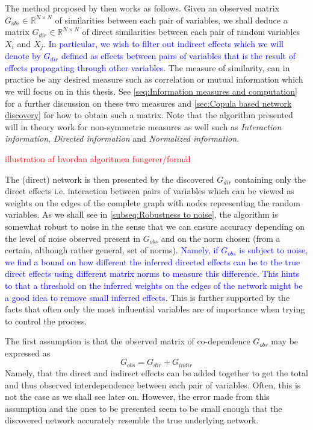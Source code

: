 \documentclass[../Thesis.tex]{subfiles}
\begin{document}
The method proposed by \cite{Network-deconvolution-as-a-general-method-to-distinguish-direct-dependencies-in-networks} then works as follows. Given an observed matrix $G_{obs} \in \mathbb{R}^{N \times N}$ of similarities between each pair of variables, we shall deduce a matrix $G_{dir} \in \mathbb{R}^{N \times N}$ of direct similarities between each pair of random variables $X_i$ and $X_j$. \textcolor{blue}{In particular, we wish to filter out indirect effects which we will denote by $G_{dir}$ defined as effects between pairs of variables that is the result of effects propagating through other variables}. The measure of similarity, can in practice be any desired measure such as correlation or mutual information which we will focus on in this thesis. See \autoref{seq:Information measures and computation} for a further discussion on these two measures and \autoref{sec:Copula based network discovery} for how to obtain such a matrix. Note that the algorithm presented will in theory work for non-symmetric measures as well such as \textit{Interaction information}, \textit{Directed information} and \textit{Normalized information}.

\textcolor{red}{illustration af hvordan algoritmen fungerer/formål}

The (direct) network is then presented by the discovered $G_{dir}$ containing only the direct effects i.e. interaction between pairs of variables which can be viewed as weights on the edges of the complete graph with nodes representing the random variables. As we shall see in \autoref{subseq:Robustness to noise}, the algorithm is somewhat robust to noise in the sense that we can ensure accuracy depending on the level of noise observed present in $G_{obs}$ and on the norm chosen (from a certain, although rather general, set of norms). \textcolor{blue}{Namely, if $G_{obs}$ is subject to noise, we find a bound on how different the inferred directed effects can be to the true direct effects using different matrix norms to measure this difference}. \textcolor{blue}{This hints to that a threshold on the inferred weights on the edges of the network might be a good idea to remove small inferred effects}. This is further supported by the facts that often only the most influential variables are of importance when trying to control the process.

The first assumption is that the observed matrix of co-dependence $G_{obs}$ may be expressed as
\begin{equation}
    G_{obs} = G_{dir} + G_{indir}
\end{equation}
Namely, that the direct and indirect effects can be added together to get the total and thus observed interdependence between each pair of variables. Often, this is not the case as we shall see later on. However, the error made from this assumption and the ones to be presented seem to be small enough that the discovered network accurately resemble the true underlying network.
\end{document}
